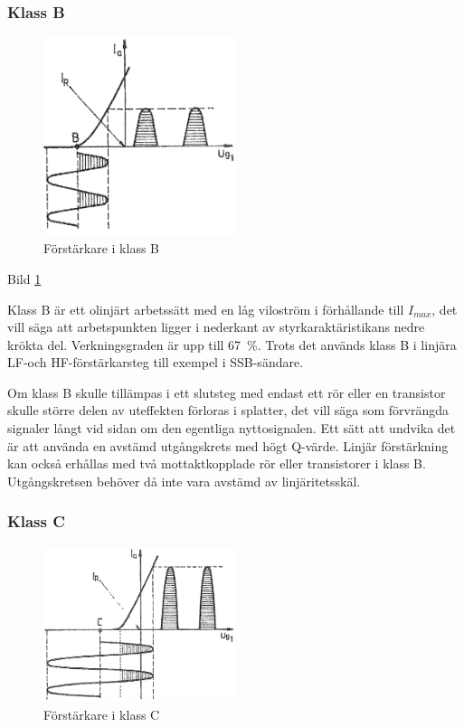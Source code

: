 \subsubsection{Klass B}

\begin{figure}
\includegraphics[width=0.5\textwidth]{images/cropped_pdfs/bild_2_3-45.pdf}
\caption{Förstärkare i klass B}
\label{fig:BildII3-45}
\end{figure}

Bild \ref{fig:BildII3-45}

Klass B är ett olinjärt arbetssätt med en låg viloström i förhållande
till \(I_{max}\), det vill säga att arbetspunkten ligger i nederkant av
styrkaraktäristikans nedre krökta del. Verkningsgraden är upp till
67~\%. Trots det används klass B i linjära LF-och HF-förstärkarsteg
till exempel i SSB-sändare.

Om klass B skulle tillämpas i ett slutsteg med endast ett rör eller en
transistor skulle större delen av uteffekten förloras i splatter,
det vill säga som förvrängda signaler långt vid sidan om den egentliga
nyttosignalen.
Ett sätt att undvika det är att använda en avstämd utgångskrets med högt
Q-värde.
Linjär förstärkning kan också erhållas med två mottaktkopplade rör eller
transistorer i klass B.
Utgångskretsen behöver då inte vara avstämd av linjäritetsskäl.

\subsubsection{Klass C}

\begin{figure}
\includegraphics[width=0.5\textwidth]{images/cropped_pdfs/bild_2_3-46.pdf}
\caption{Förstärkare i klass C}
\label{fig:BildII3-46}
\end{figure}

